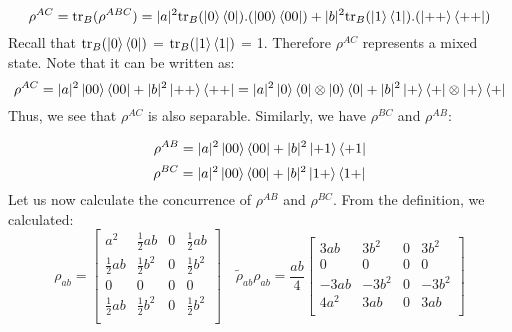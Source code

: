\documentclass{scrartcl}
\begin{document}
\[\rho^{AC} = \mathrm{tr}_B(\rho^{ABC})=|a|^2\mathrm{tr}_B(\ket{0}\bra{0}).(\ket{00}\bra{00}) + |b|^2\mathrm{tr}_B(\ket{1}\bra{1}).(\ket{++}\bra{++})\]
Recall that $\mathrm{tr}_B(\ket{0}\bra{0})$ = $\mathrm{tr}_B(\ket{1}\bra{1})$ = 1. 
Therefore $\rho^{AC}$ represents a mixed state. Note that it can be written as:
\[
    \rho^{AC} = |a|^2\ket{00}\bra{00}+|b|^2\ket{++}\bra{++}=|a|^2\ket{0}\bra{0}\otimes\ket{0}\bra{0}+|b|^2\ket{+}\bra{+}\otimes\ket{+}\bra{+}
\]
Thus, we see that $\rho^{AC}$ is also separable. 
Similarly, we have $\rho^{BC}$ and $\rho^{AB}$:

\[
\rho^{AB}=|a|^2\ket{00}\bra{00}+|b|^2\ket{+1}\bra{+1}
\]
\[
\rho^{BC}=|a|^2\ket{00}\bra{00}+|b|^2\ket{1+}\bra{1+}
\]
Let us now calculate the concurrence of $\rho^{AB}$ and $\rho^{BC}$. From the definition, we calculated: 
\begin{equation*}
    \rho_{ab} =
    \left[
    \begin{array}{cccc}
    a^{2} & \frac{1}{2} a b & 0 & \frac{1}{2} a b \\[0.3cm]
    \frac{1}{2} a b & \frac{1}{2} b^{2} & 0 & \frac{1}{2} b^{2} \\[0.3cm]
    0 & 0 & 0 & 0 \\[0.3cm]
    \frac{1}{2} a b & \frac{1}{2} b^{2} & 0 & \frac{1}{2} b^{2} \\[0.3cm]
    \end{array}
    \right]\quad \tilde{\rho}_{ab}\rho_{ab} = \frac{ab}{4}\left[
        \begin{array}{cccc}
        3 a b & 3 b^{2} & 0 & 3 b^{2} \\[0.5cm]
        0 & 0 & 0 & 0 \\[0.5cm]
        -3 a b & -3 b^{2} & 0 & -3 b^{2} \\[0.5cm]
        4 a^{2} & 3 a b & 0 & 3 a b \\[0.5cm]
        \end{array}
        \right]
    \end{equation*}
\end{document}
